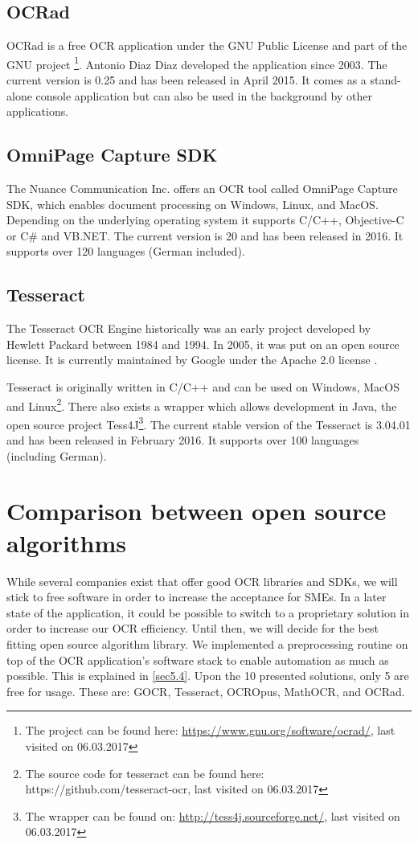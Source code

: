 \label{OCRad}
\subsection{OCRad}
OCRad is a free OCR application under the GNU Public License and part of the GNU project \footnote{The project can be found here: \url{https://www.gnu.org/software/ocrad/}, last visited on 06.03.2017}. Antonio Diaz Diaz developed the application since 2003. The current version is 0.25 and has been released in April 2015. It comes as a stand-alone console application but can also be used in the background by other applications.

\label{OmniPage}
\subsection{OmniPage Capture SDK}
The Nuance Communication Inc. offers an OCR tool called OmniPage Capture SDK, which enables document processing on Windows, Linux, and MacOS. Depending on the underlying operating system it supports C/C++, Objective-C or C\# and VB.NET. The current version is 20 and has been released in 2016. It supports over 120 languages (German included).

\label{Tesseract}
\subsection{Tesseract}
The Tesseract OCR Engine historically was an early project developed by Hewlett Packard between 1984 and 1994. In 2005, it was put on an open source license. It is currently maintained by Google under the Apache 2.0 license \cite{smith07}.

Tesseract is originally written in C/C++ and can be used on Windows, MacOS and Linux\footnote{The source code for tesseract can be found here: https://github.com/tesseract-ocr, last visited on 06.03.2017}. There also exists a wrapper which allows development in Java, the open source project Tess4J\footnote{The wrapper can be found on: \url{http://tess4j.sourceforge.net/}, last visited on 06.03.2017}. The current stable version of the Tesseract is 3.04.01 and has been released in February 2016. It supports over 100 languages (including German). 

\section{Comparison between open source algorithms}
\label{sec3.2}
While several companies exist that offer good OCR libraries and SDKs, we will stick to free software in order to increase the acceptance for SMEs. In a later state of the application, it could be possible to switch to a proprietary solution in order to increase our OCR efficiency. Until then, we will decide for the best fitting open source algorithm library. We implemented a preprocessing routine on top of the OCR application's software stack to enable automation as much as possible. This is explained in \ref{sec5.4}. Upon the 10 presented solutions, only 5 are free for usage. These are: GOCR, Tesseract, OCROpus, MathOCR, and OCRad.


